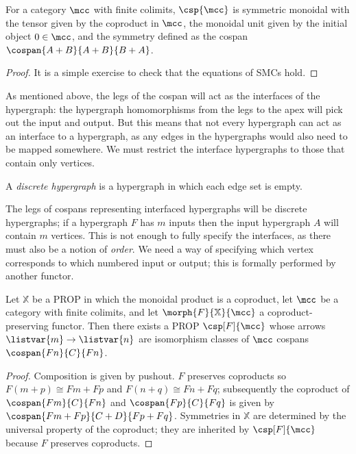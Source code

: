 \begin{lemma}
    For a category \(\mcc\) with finite colimits,
    \(\csp{\mcc}\) is symmetric monoidal with the tensor given by the
    coproduct in \(\mcc\), the monoidal unit given by the initial object
    \(0 \in \mcc\), and the symmetry defined as the cospan
    \(\cospan{A+B}{A+B}{B+A}\).
\end{lemma}
\begin{proof}
    It is a simple exercise to check that the equations of SMCs hold.
\end{proof}

As mentioned above, the legs of the cospan will act as the interfaces of the
hypergraph: the hypergraph homomorphisms from the legs to the apex will pick out
the input and output.
But this means that not every hypergraph can act as an interface to a
hypergraph, as any edges in the hypergraphs would also need to be mapped
somewhere.
We must restrict the interface hypergraphs to those that contain only vertices.

\begin{definition}
    A \emph{discrete hypergraph} is a hypergraph in which each edge set is
    empty.
\end{definition}

The legs of cospans representing interfaced hypergraphs will be discrete
hypergraphs; if a hypergraph \(F\) has \(m\) inputs then the input hypergraph
\(A\) will contain \(m\) vertices.
This is not enough to fully specify the interfaces, as there must also be a
notion of \emph{order}.
We need a way of specifying which vertex corresponds to which numbered input or
output; this is formally performed by another functor.

\begin{theorem}\label{thm:csp-construction}
    Let \(\mathbb{X}\) be a PROP in which the monoidal product is a coproduct,
    let \(\mcc\) be a category with finite colimits, and
    let \(\morph{F}{\mathbb{X}}{\mcc}\) a coproduct-preserving functor.
    Then there exists a PROP \(\csp[F]{\mcc}\) whose arrows
    \(\listvar{m} \to \listvar{n}\) are isomorphism classes of \(\mcc\)
    cospans \(\cospan{Fn}{C}{Fn}\).
\end{theorem}
\begin{proof}
    Composition is given by pushout.
    \(F\) preserves coproducts so \(F(m+p) \cong Fm + Fp\) and
    \(F(n+q) \cong Fn + Fq\); subsequently the coproduct of
    \(\cospan{Fm}{C}{Fn}\) and \(\cospan{Fp}{C}{Fq}\) is given by \(
    \cospan{Fm + Fp}{C + D}{Fp + Fq}
    \).
    Symmetries in \(\mathbb{X}\) are determined by the universal property of
    the coproduct; they are inherited by \(\csp[F]{\mcc}\) because \(F\)
    preserves coproducts.
\end{proof}


